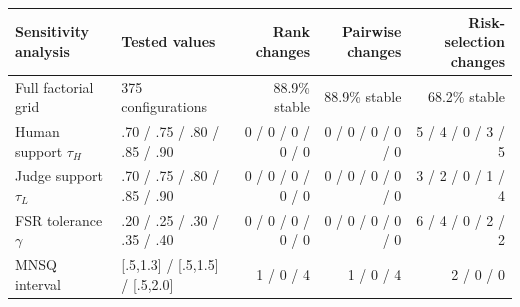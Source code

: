 \begin{tabular}{llrrr}
\toprule
Sensitivity analysis & Tested values & Rank changes & Pairwise changes & Risk-selection changes \\
\midrule
Full factorial grid & 375 configurations & 88.9\% stable & 88.9\% stable & 68.2\% stable \\
Human support $\tau_H$ & .70 / .75 / .80 / .85 / .90 & 0 / 0 / 0 / 0 / 0 & 0 / 0 / 0 / 0 / 0 & 5 / 4 / 0 / 3 / 5 \\
Judge support $\tau_L$ & .70 / .75 / .80 / .85 / .90 & 0 / 0 / 0 / 0 / 0 & 0 / 0 / 0 / 0 / 0 & 3 / 2 / 0 / 1 / 4 \\
FSR tolerance $\gamma$ & .20 / .25 / .30 / .35 / .40 & 0 / 0 / 0 / 0 / 0 & 0 / 0 / 0 / 0 / 0 & 6 / 4 / 0 / 2 / 2 \\
MNSQ interval & [.5,1.3] / [.5,1.5] / [.5,2.0] & 1 / 0 / 4 & 1 / 0 / 4 & 2 / 0 / 0 \\
\bottomrule
\end{tabular}
